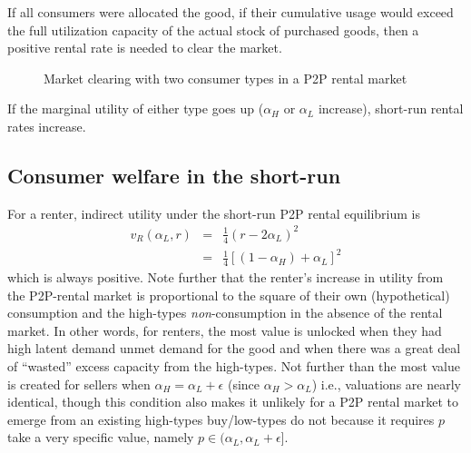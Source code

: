 \documentclass[11pt]{article}
\begin{document}
\begin{prop}
If all consumers were allocated the good, if their cumulative usage would exceed the full utilization capacity of the actual stock of purchased goods, then a positive rental rate is needed to clear the market. 
\end{prop} 


\newcommand*{\alphaH}{0.80}%
\newcommand*{\alphaL}{0.70}%
\pgfmathsetmacro{\r}{-1 + \alphaH + \alphaL}%
\pgfmathsetmacro{\Q}{\alphaL - \r/2}
\begin{figure} 
\caption{Market clearing with two consumer types in a P2P rental market} 
\label{fig:market_clearing} 
\begin{center}
\end{center}
\end{figure} 


\begin{prop}
If the marginal utility of either type goes up ($\alpha_H$ or $\alpha_L$ increase), short-run rental rates increase. 
\end{prop} 

\subsection{Consumer welfare in the short-run} 
For a renter, indirect utility under the short-run P2P rental equilibrium is
\begin{eqnarray} 
v_R(\alpha_L, r) &=& \frac{1}{4}\left(r - 2\alpha_L \right)^2  \\
                 &=& \frac{1}{4} \left[ (1-\alpha_H) + \alpha_L \right]^2
\end{eqnarray} 
which is always positive. 
Note further that the renter's increase in utility from the P2P-rental market is proportional to the square of their own (hypothetical) consumption and the high-types \emph{non}-consumption in the absence of the rental market. 
In other words, for renters, the most value is unlocked when they had high latent demand unmet demand for the good and when there was a great deal of ``wasted'' excess capacity from the high-types. 
Not further than the most value is created for sellers when $\alpha_H = \alpha_L + \epsilon$ (since $\alpha_H > \alpha_L$) i.e., valuations are nearly identical, though this condition also makes it unlikely for a P2P rental market to emerge from an existing high-types buy/low-types do not because it requires $p$ take a very specific value, namely $p \in (\alpha_L, \alpha_L + \epsilon]$. 
\end{document}
